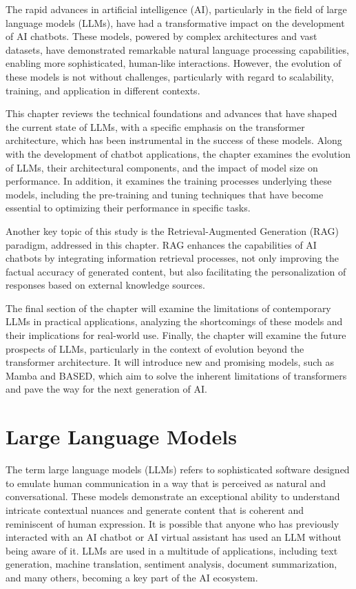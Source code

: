 The rapid advances in artificial intelligence (AI), particularly in the field of large language models (LLMs), have had a transformative impact on the development of AI chatbots. These models, powered by complex architectures and vast datasets, have demonstrated remarkable natural language processing capabilities, enabling more sophisticated, human-like interactions. However, the evolution of these models is not without challenges, particularly with regard to scalability, training, and application in different contexts.

This chapter reviews the technical foundations and advances that have shaped the current state of LLMs, with a specific emphasis on the transformer architecture, which has been instrumental in the success of these models. Along with the development of chatbot applications, the chapter examines the evolution of LLMs, their architectural components, and the impact of model size on performance. In addition, it examines the training processes underlying these models, including the pre-training and tuning techniques that have become essential to optimizing their performance in specific tasks.

Another key topic of this study is the Retrieval-Augmented Generation (RAG) paradigm, addressed in this chapter. RAG enhances the capabilities of AI chatbots by integrating information retrieval processes, not only improving the factual accuracy of generated content, but also facilitating the personalization of responses based on external knowledge sources.

The final section of the chapter will examine the limitations of contemporary LLMs in practical applications, analyzing the shortcomings of these models and their implications for real-world use. Finally, the chapter will examine the future prospects of LLMs, particularly in the context of evolution beyond the transformer architecture. It will introduce new and promising models, such as Mamba and BASED, which aim to solve the inherent limitations of transformers and pave the way for the next generation of AI.

\section{Large Language Models}

The term large language models (LLMs) refers to sophisticated software designed to emulate human communication in a way that is perceived as natural and conversational. These models demonstrate an exceptional ability to understand intricate contextual nuances and generate content that is coherent and reminiscent of human expression. It is possible that anyone who has previously interacted with an AI chatbot or AI virtual assistant has used an LLM without being aware of it. LLMs are used in a multitude of applications, including text generation, machine translation, sentiment analysis, document summarization, and many others, becoming a key part of the AI ecosystem.

